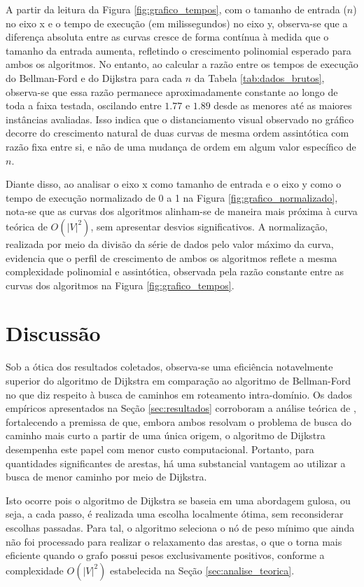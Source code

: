 \documentclass[12pt]{article}
\begin{document}
A partir da leitura da Figura \ref{fig:grafico_tempos}, com o tamanho
de entrada ($n$) no eixo x e o tempo de execução (em milissegundos)
no eixo y, observa-se que a diferença absoluta entre as curvas cresce
de forma contínua à medida que o tamanho da entrada aumenta,
refletindo o crescimento polinomial esperado para ambos os
algoritmos. No entanto, ao calcular a razão entre os tempos de
execução do Bellman-Ford e do Dijkstra para cada $n$ da Tabela
\ref{tab:dados_brutos}, observa-se que essa razão permanece
aproximadamente constante ao longo de toda a faixa testada, oscilando
entre $1.77$ e $1.89$ desde as menores até as maiores instâncias
avaliadas. Isso indica que o distanciamento visual observado no
gráfico decorre do crescimento natural de duas curvas de mesma ordem
assintótica com razão fixa entre si, e não de uma mudança de ordem em
algum valor específico de $n$.

Diante disso, ao analisar o eixo x como tamanho de entrada e o eixo
y como o tempo de execução normalizado de 0 a 1 na Figura
\ref{fig:grafico_normalizado}, nota-se que as curvas dos algoritmos
alinham-se de maneira mais próxima à curva teórica de $O(|V|^2)$, sem
apresentar desvios significativos. A normalização, realizada por meio
da divisão da série de dados pelo valor máximo da curva, evidencia
que o perfil de crescimento de ambos os algoritmos reflete a mesma
complexidade polinomial e assintótica, observada pela razão constante
entre as curvas dos algoritmos na Figura \ref{fig:grafico_tempos}.

\section{Discussão}

Sob a ótica dos resultados coletados, observa-se uma eficiência
notavelmente superior do algoritmo de Dijkstra em comparação ao
algoritmo de Bellman-Ford no que diz respeito à busca de caminhos em
roteamento intra-domínio. Os dados empíricos apresentados na Seção
\ref{sec:resultados} corroboram a análise teórica de
\cite{thippeswamy}, fortalecendo a premissa de que, embora ambos
resolvam o problema de busca do caminho mais curto a partir de uma
única origem, o algoritmo de Dijkstra desempenha este papel com menor
custo computacional. Portanto, para quantidades significantes de
arestas, há uma substancial vantagem ao utilizar a busca de menor
caminho por meio de Dijkstra.

Isto ocorre pois o algoritmo de Dijkstra se baseia em uma abordagem
gulosa, ou seja, a cada passo, é realizada uma escolha localmente
ótima, sem reconsiderar escolhas passadas. Para tal, o algoritmo
seleciona o nó de peso mínimo que ainda não foi processado para
realizar o relaxamento das arestas, o que o torna mais eficiente
quando o grafo possui pesos exclusivamente positivos, conforme a
complexidade $O(|V|^2)$ estabelecida na Seção \ref{sec:analise_teorica}.
\end{document}
